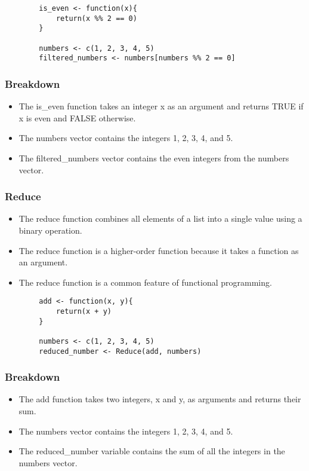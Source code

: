 \documentclass[serif, 9pt, aspectratio=32]{beamer}
\begin{document}
\begin{frame}[fragile]
    \begin{lstlisting}
        is_even <- function(x){
            return(x %% 2 == 0)
        }

        numbers <- c(1, 2, 3, 4, 5)
        filtered_numbers <- numbers[numbers %% 2 == 0]
    \end{lstlisting}
\end{frame}

\begin{frame}
    \centering
    \frametitle{Breakdown}
    \begin{itemize}
        \setlength{\itemsep}{2em}
        \item The is\_even function takes an integer x as an argument and returns TRUE if x is even and FALSE otherwise.
        \item The numbers vector contains the integers 1, 2, 3, 4, and 5.
        \item The filtered\_numbers vector contains the even integers from the numbers vector.
    \end{itemize}
\end{frame}

\begin{frame}
    \centering
    \frametitle{Reduce}
    \begin{itemize}
        \setlength{\itemsep}{2em}
        \item The reduce function combines all elements of a list into a single value using a binary operation.
        \item The reduce function is a higher-order function because it takes a function as an argument.
        \item The reduce function is a common feature of functional programming.
    \end{itemize}
\end{frame}

\begin{frame}[fragile]
    \begin{lstlisting}
        add <- function(x, y){
            return(x + y)
        }

        numbers <- c(1, 2, 3, 4, 5)
        reduced_number <- Reduce(add, numbers)
    \end{lstlisting}
\end{frame}

\begin{frame}
    \centering
    \frametitle{Breakdown}
    \begin{itemize}
        \setlength{\itemsep}{2em}
        \item The add function takes two integers, x and y, as arguments and returns their sum.
        \item The numbers vector contains the integers 1, 2, 3, 4, and 5.
        \item The reduced\_number variable contains the sum of all the integers in the numbers vector.
    \end{itemize}
\end{frame}
\end{document}
